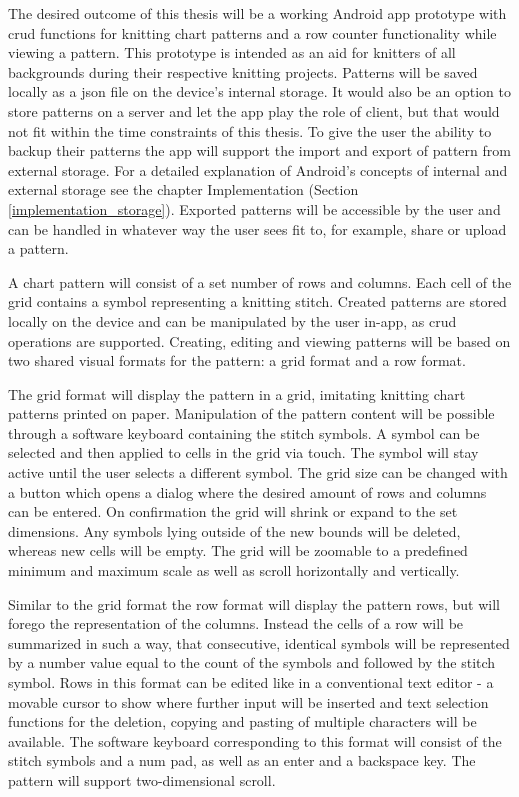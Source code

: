 ﻿The desired outcome of this thesis will be a working Android app prototype with \gls{crud} functions for knitting chart patterns and a row counter functionality while viewing a pattern. This prototype is intended as an aid for knitters of all backgrounds during their respective knitting projects. Patterns will be saved locally as a \gls{json} file on the device's internal storage. It would also be an option to store patterns on a server and let the app play the role of client, but that would not fit within the time constraints of this thesis. To give the user the ability to backup their patterns the app will support the import and export of pattern from external storage. For a detailed explanation of Android's concepts of internal and external storage see the chapter Implementation (Section \ref{implementation_storage}). Exported patterns will be accessible by the user and can be handled in whatever way the user sees fit to, for example, share or upload a pattern.

A chart pattern will consist of a set number of rows and columns. Each cell of the grid contains a symbol representing a knitting stitch. Created patterns are stored locally on the device and can be manipulated by the user in-app, as \gls{crud} operations are supported. Creating, editing and viewing patterns will be based on two shared visual formats for the pattern: a grid format and a row format.

The grid format will display the pattern in a grid, imitating knitting chart patterns printed on paper. Manipulation of the pattern content will be possible through a software keyboard containing the stitch symbols. A symbol can be selected and then applied to cells in the grid via touch. The symbol will stay active until the user selects a different symbol. The grid size can be changed with a button which opens a dialog where the desired amount of rows and columns can be entered. On confirmation the grid will shrink or expand to the set dimensions. Any symbols lying outside of the new bounds will be deleted, whereas new cells will be empty. The grid will be zoomable to a predefined minimum and maximum scale as well as scroll horizontally and vertically.

Similar to the grid format the row format will display the pattern rows, but will forego the representation of the columns. Instead the cells of a row will be summarized in such a way, that consecutive, identical symbols will be represented  by a number value equal to the count of the symbols and followed by the stitch symbol. Rows in this format can be edited like in  a conventional text editor - a movable cursor to show where further input will be inserted and text selection functions for the deletion, copying and pasting of multiple characters will be available. The software keyboard corresponding to this format will consist of the stitch symbols and a num pad, as well as an enter and a backspace key. The pattern will support two-dimensional scroll.

